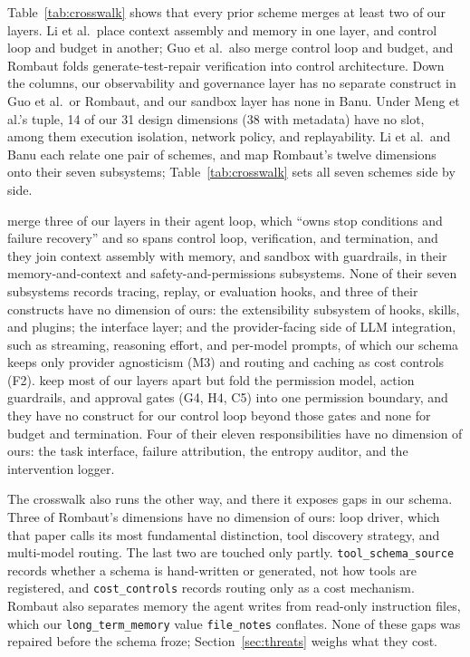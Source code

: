 Table~\ref{tab:crosswalk} shows that every prior scheme merges at least two of our layers. Li et al.\
place context assembly and memory in one layer, and control loop and budget in another; Guo et al.\
also merge control loop and budget, and Rombaut folds generate-test-repair verification into control
architecture. Down the columns, our observability and governance layer has no separate construct in Guo
et al.\ or Rombaut, and our sandbox layer has none in Banu. Under Meng et al.'s tuple, 14 of our 31
design dimensions (38 with metadata) have no slot, among them execution isolation, network policy, and replayability.
Li et al.\ and Banu each relate one pair of schemes, and \citet{barbaste2026anatomy} map Rombaut's
twelve dimensions onto their seven subsystems; Table~\ref{tab:crosswalk} sets all seven schemes side by side.

\citet{barbaste2026anatomy} merge three of our layers in their agent loop, which ``owns stop
conditions and failure recovery'' and so spans control loop, verification, and termination, and they
join context assembly with memory, and sandbox with guardrails, in their memory-and-context and
safety-and-permissions subsystems. None of their seven subsystems records tracing, replay, or
evaluation hooks, and three of their constructs have no dimension of ours: the extensibility
subsystem of hooks, skills, and plugins; the interface layer; and the provider-facing side of LLM
integration, such as streaming, reasoning effort, and per-model prompts, of which our schema keeps
only provider agnosticism (M3) and routing and caching as cost controls (F2).
\citet{zhong2026responsibilities} keep most of our layers apart but fold the permission model, action
guardrails, and approval gates (G4, H4, C5) into one permission boundary, and they have no construct
for our control loop beyond those gates and none for budget and termination. Four of their eleven
responsibilities have no dimension of ours: the task interface, failure attribution, the entropy
auditor, and the intervention logger.

The crosswalk also runs the other way, and there it exposes gaps in our schema. Three of Rombaut's
dimensions have no dimension of ours: loop driver, which that paper calls its most fundamental
distinction, tool discovery strategy, and multi-model routing. The last two are touched only partly.
\texttt{tool\_schema\_source} records whether a schema is hand-written or generated, not how
tools are registered, and \texttt{cost\_controls} records routing only as a cost mechanism.
Rombaut also separates memory the agent writes from read-only instruction files, which our
\texttt{long\_term\_memory} value \texttt{file\_notes} conflates. None of these gaps was repaired before
the schema froze; Section~\ref{sec:threats} weighs what they cost.

